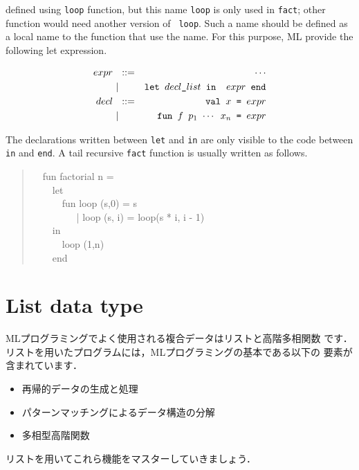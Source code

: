 \documentclass{jbook}
\newcommand{\txt}[2]{#2}
\newcommand{\vbar}{\mbox{\ $|$\ }}
\newcommand{\myem}{\mbox{\ \ }}
\newcommand{\myfm}{\mbox{ \ \ }}
\begin{document}
defined using {\tt loop} function, but this name {\tt loop} is only
used in {\tt fact}; other function would need another version of {\tt
loop}.
	Such a name should be defined as a local name to the function
that use the name.
	For this purpose, ML provide the following let expression.
\begin{tt}
\begin{eqnarray*}
expr &\mbox{\ \ }::=& \cdots \\
     &\vbar& \mbox{\tt let\ $decl\_list$\ in \ $expr$\ end}
\\
decl &\mbox{\ \ }::=& \mbox{\tt val\ $x$ = $expr$}
\\
     &\vbar& \mbox{\tt fun\ $f$\ $p_1$ $\cdots$ $x_n$ =  $expr$}
\end{eqnarray*}
\end{tt}
	The declarations written between 
{\tt let} and {\tt in} are only visible to the code between {\tt in} and
{\tt end}.
	A tail recursive {\tt fact} function is usually written as follows.
\begin{tt}
\begin{quote}
\myem  fun factorial n =
\\\myem\myem    let
\\\myem\myem\myem      fun loop (s,0) = s
\\\myem\myem\myem\myfm        | loop (s, i) = loop(s * i, i - 1)
\\\myem\myem    in
\\\myem\myem\myem      loop (1,n)
\\\myem\myem    end
\end{quote}
\end{tt}
\fi%

\section{\txt{リストデータ型}{List data type}}
\label{sec:tutorialList}

\ifjp%
	MLプログラミングでよく使用される複合データはリストと高階多相関数
です．
	リストを用いたプログラムには，MLプログラミングの基本である以下の
要素が含まれています．
\begin{itemize}
\item 
再帰的データの生成と処理
\item 
パターンマッチングによるデータ構造の分解
\item 
多相型高階関数
\end{itemize}
	リストを用いてこれら機能をマスターしていきましょう．
\end{document}
